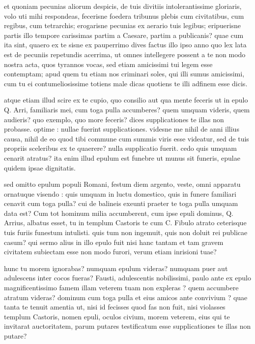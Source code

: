  et quoniam pecunias aliorum despicis, de tuis divitiis intolerantissime gloriaris, volo uti mihi respondeas, fecerisne foedera tribunus plebis cum civitatibus, cum regibus, cum tetrarchis; erogarisne pecunias ex aerario tuis legibus; eripuerisne partis illo tempore carissimas partim a Caesare, partim a publicanis? quae cum ita sint, quaero ex te sisne ex pauperrimo dives factus illo ipso anno quo lex lata est de pecuniis repetundis acerrima, ut omnes intellegere possent a te non modo nostra acta, quos tyrannos vocas, sed etiam amicissimi tui legem esse contemptam; apud quem tu etiam nos criminari soles, qui illi sumus amicissimi, cum tu ei contumeliosissime totiens male dicas quotiens te illi adfinem esse dicis.

 atque etiam illud scire ex te cupio, quo consilio aut qua mente feceris ut in epulo Q. Arri, familiaris mei, cum toga pulla accumberes? quem umquam videris, quem audieris? quo exemplo, quo more feceris? dices supplicationes te illas non probasse. optime : nullae fuerint supplicationes. videsne me nihil de anni illius causa, nihil de eo quod tibi commune cum summis viris esse videatur, sed de tuis propriis sceleribus ex te quaerere? nulla supplicatio fuerit. cedo quis umquam cenarit atratus? ita enim illud epulum est funebre ut munus sit funeris, epulae quidem ipsae dignitatis.

 sed omitto epulum populi Romani, festum diem argento, veste, omni apparatu ornatuque visendo : quis umquam in luctu domestico, quis in funere familiari cenavit cum toga pulla? cui de balineis exeunti praeter te toga pulla umquam data est? Cum tot hominum milia accumberent, cum ipse epuli dominus, Q. Arrius, albatus esset, tu in templum Castoris te cum C. Fibulo atrato ceterisque tuis furiis funestum intulisti. quis tum non ingemuit, quis non doluit rei publicae casum? qui sermo alius in illo epulo fuit nisi hanc tantam et tam gravem civitatem subiectam esse non modo furori, verum etiam inrisioni tuae?

 hunc tu morem ignorabas? numquam epulum videras? numquam puer aut adulescens inter cocos fueras? Fausti, adulescentis nobilissimi, paulo ante ex epulo magnificentissimo famem illam veterem tuam non expleras ? quem accumbere atratum videras? dominum cum toga pulla et eius amicos ante convivium ? quae tanta te tenuit amentia ut, nisi id fecisses quod fas non fuit, nisi violasses templum Castoris, nomen epuli, oculos civium, morem veterem, eius qui te invitarat auctoritatem, parum putares testificatum esse supplicationes te illas non putare?

